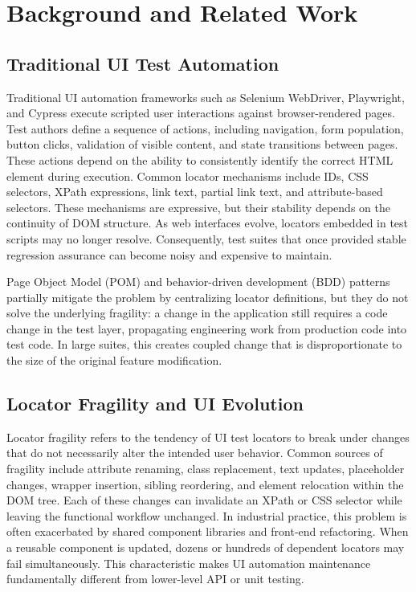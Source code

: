 \documentclass[conference]{IEEEtran}
\begin{document}
\section{Background and Related Work}
\label{sec:background}

\subsection{Traditional UI Test Automation}
Traditional UI automation frameworks such as Selenium WebDriver, Playwright, and Cypress execute scripted user interactions against browser-rendered pages. Test authors define a sequence of actions, including navigation, form population, button clicks, validation of visible content, and state transitions between pages. These actions depend on the ability to consistently identify the correct HTML element during execution. Common locator mechanisms include IDs, CSS selectors, XPath expressions, link text, partial link text, and attribute-based selectors. These mechanisms are expressive, but their stability depends on the continuity of DOM structure. As web interfaces evolve, locators embedded in test scripts may no longer resolve. Consequently, test suites that once provided stable regression assurance can become noisy and expensive to maintain.

Page Object Model (POM) and behavior-driven development (BDD) patterns partially mitigate the problem by centralizing locator definitions, but they do not solve the underlying fragility: a change in the application still requires a code change in the test layer, propagating engineering work from production code into test code. In large suites, this creates coupled change that is disproportionate to the size of the original feature modification.

\subsection{Locator Fragility and UI Evolution}
Locator fragility refers to the tendency of UI test locators to break under changes that do not necessarily alter the intended user behavior. Common sources of fragility include attribute renaming, class replacement, text updates, placeholder changes, wrapper insertion, sibling reordering, and element relocation within the DOM tree. Each of these changes can invalidate an XPath or CSS selector while leaving the functional workflow unchanged. In industrial practice, this problem is often exacerbated by shared component libraries and front-end refactoring. When a reusable component is updated, dozens or hundreds of dependent locators may fail simultaneously. This characteristic makes UI automation maintenance fundamentally different from lower-level API or unit testing.
\end{document}
